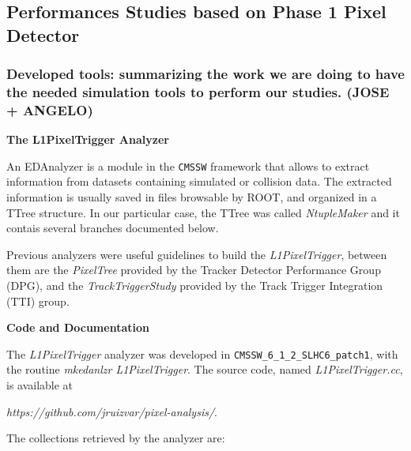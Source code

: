 \subsection{Performances Studies based on Phase 1 Pixel Detector}

\subsubsection{Developed tools: summarizing the work we are doing to have the needed simulation tools to perform our studies. (JOSE + ANGELO)}

\textbf{The L1PixelTrigger Analyzer}

An EDAnalyzer is a module in the \texttt{CMSSW} framework that allows to extract information from datasets
containing simulated or collision data. The extracted information is usually saved in files browsable by ROOT,
and organized in a TTree structure. In our particular case, the TTree was called \textit{NtupleMaker} and it
contais several branches documented below.

Previous analyzers were useful guidelines to build the \textit{L1PixelTrigger}, between them are the
\textit{PixelTree} provided by the Tracker Detector Performance Group (DPG), and the \textit{TrackTriggerStudy}
provided by the Track Trigger Integration (TTI) group.

\textbf{Code and Documentation}

The \textit{L1PixelTrigger} analyzer was developed in \texttt{CMSSW\_6\_1\_2\_SLHC6\_patch1}, with the routine
{\it mkedanlzr L1PixelTrigger}. The source code, named {\it L1PixelTrigger.cc}, is available at

{\it https://github.com/jruizvar/pixel-analysis/}. 

The collections retrieved by the analyzer are:

